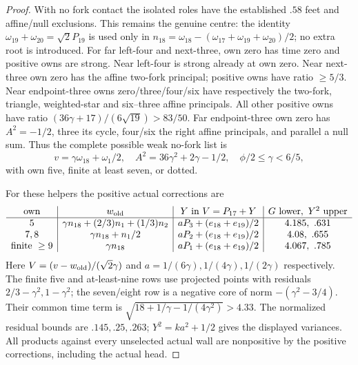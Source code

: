 \documentclass[11pt]{article}
\theoremstyle{definition}
\theoremstyle{remark}
\begin{document}
\begin{proof}
With no fork contact the isolated roles have the established
$.58$ feet and affine/null exclusions. This remains the genuine
centre: the identity
$\omega_{19}+\omega_{20}=\sqrt2P_{19}$ is used only in
$n_{18}=\omega_{18}-(\omega_{17}+\omega_{19}+\omega_{20})/2$;
no extra root is introduced. For far left-four and next-three,
own zero has time zero and positive owns are strong.
Near left-four is strong already at own zero. Near next-three
own zero has the affine two-fork principal; positive owns have
ratio $\ge5/3$. Near endpoint-three owns zero/three/four/six
have respectively the two-fork, triangle, weighted-star and
six--three affine principals. All other positive owns have
ratio $(36\gamma+17)/(6\sqrt{19})>83/50$.
Far endpoint-three own zero has $A^2=-1/2$, three its cycle,
four/six the right affine principals, and parallel a null sum.
Thus the complete possible weak no-fork list is
\[
 v=\gamma\omega_{18}+\omega_1/2,\quad
 A^2=36\gamma^2+2\gamma-1/2,
 \quad \phi/2\le\gamma<6/5,
\]
with own five, finite at least seven, or dotted.

For these helpers the positive actual corrections are
\[
\begin{array}{c|c|c|c}
\text{own}&w_{\rm old}&Y\text{ in }V=P_{17}+Y&G\text{ lower},\ Y^2\text{ upper}\\\hline
5&\gamma n_{18}+(2/3)n_1+(1/3)n_2&aP_3+(e_{18}+e_{19})/2&4.185,\ .631\\
7,8&\gamma n_{18}+n_1/2&aP_2+(e_{18}+e_{19})/2&4.08,\ .655\\
\text{finite }\ge9&\gamma n_{18}&aP_1+(e_{18}+e_{19})/2&4.067,\ .785
\end{array}
\]
Here $V=(v-w_{\rm old})/(\sqrt2\gamma)$ and
$a=1/(6\gamma),1/(4\gamma),1/(2\gamma)$ respectively.
The finite five and at-least-nine rows use projected points
with residuals $2/3-\gamma^2,1-\gamma^2$; the seven/eight
row is a negative core of norm $-(\gamma^2-3/4)$.
Their common time term is
$\sqrt{18+1/\gamma-1/(4\gamma^2)}>4.33$.
The normalized residual bounds are $.145,.25,.263$;
$Y^2=ka^2+1/2$ gives the displayed variances.
All products against every unselected actual wall are nonpositive
by the positive corrections, including the actual head.


\end{proof}
\end{document}
